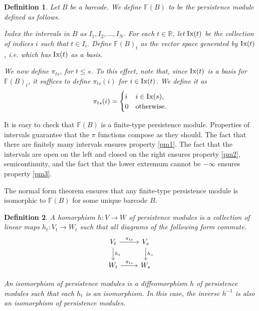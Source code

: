 \documentclass{article}
\newtheorem{definition}{Definition}
\theoremstyle{nonumberplain}
\newcommand{\R}{\mathbb{R}}
\newcommand{\FF}{\mathbb{F}} %
\newcommand{\Ix}{\mathop{\mathrm{I\mkern0.7mu x}}}
\begin{document}
\begin{definition}
Let $B$ be a barcode. We define $\FF(B)$ to be the persistence module defined as follows.

Index the intervals in $B$ as $I_1, I_2, \dots, I_N$. For each $t \in \R$, let $\Ix(t)$ be the collection of indices $i$ such that $t \in I_i$. Define $\FF(B)_t$ as the vector space generated by $\Ix(t)$, i.e. which has $\Ix(t)$ as a basis.

We now define $\pi_{ts}$, for $t \leq s$. To this effect, note that, since $\Ix(t)$ is a basis for $\FF(B)_t$, it suffices to define $\pi_{ts}(i)$ for $i \in \Ix(t)$. We define it as
\begin{equation}
\pi_{ts}(i) = \begin{cases} i & i \in \Ix(s),\\ 0 & \text{otherwise}. \end{cases}
\end{equation}
\end{definition}

It is easy to check that $\FF(B)$ is a finite-type persistence module. Properties of intervals guarantee that the $\pi$ functions compose as they should. The fact that there are finitely many intervals ensures property \ref{pm1}. The fact that the intervals are open on the left and closed on the right ensures property \ref{pm2}, semicontinuity, and the fact that the lower extremum cannot be $-\infty$ ensures property \ref{pm3}.

The normal form theorem ensures that any finite-type persistence module is isomorphic to $\FF(B)$ for some unique barcode $B$.

\begin{definition}
A homorphism $h \colon V \to W$ of persistence modules is a collection of linear maps $h_t \colon V_t \to W_t$ such that all diagrams of the following form commute.
\begin{equation}
\begin{tikzcd}
V_t \arrow[d, "h_t"] \arrow[r, "\pi_{ts}"] & V_s \arrow[d, "h_s"] \\
W_t \arrow[r, "\pi_{ts}"]                  & W_s                 
\end{tikzcd}
\end{equation}

An isomorphism of persistence modules is a diffeomorphism $h$ of persistence modules such that each $h_t$ is an isomorphism. In this case, the inverse $h^{-1}$ is also an isomorphism of persistence modules.
\end{definition}
\end{document}
